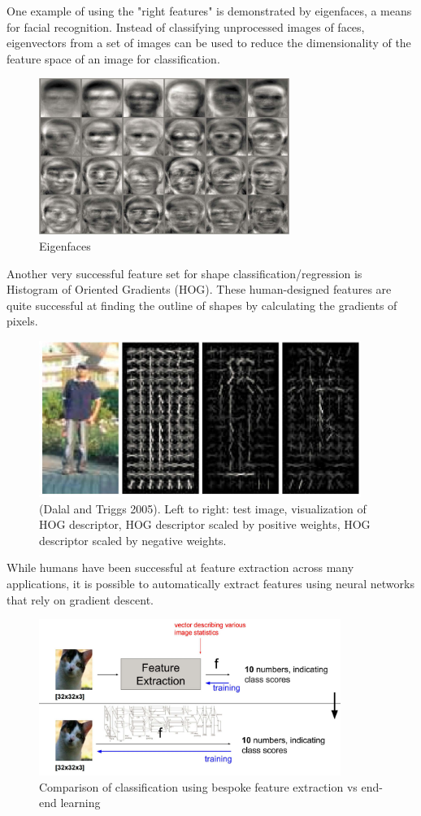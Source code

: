 \documentclass[twoside]{article}
\begin{document}
One example of using the "right features" is demonstrated by eigenfaces, a means for facial recognition. Instead of classifying unprocessed images of faces, eigenvectors from a set of images can be used to reduce the dimensionality of the feature space of an image for classification.
\begin{figure}[H]
\centering
\includegraphics[height = 2in]{pics/lecture_8_eigenfaces.jpg}
\caption{Eigenfaces}
\end{figure}

Another very successful feature set for shape classification/regression is Histogram of Oriented Gradients (HOG). These human-designed features are quite successful at finding the outline of shapes by calculating the gradients of pixels.

\begin{figure}[H]
\centering
\includegraphics[height = 2in]{pics/lecture_8_HOG.jpg}
\caption{(Dalal and Triggs 2005). Left to right: test image, visualization of HOG descriptor, HOG descriptor scaled by positive weights, HOG descriptor scaled by negative weights.}
\end{figure}

While humans have been successful at feature extraction across many applications, it is possible to automatically extract features using neural networks that rely on gradient descent.
\begin{figure}[H]
\centering
\includegraphics[height = 2in]{pics/lecture_8_feature_extraction.jpg}
\caption{Comparison of classification using bespoke feature extraction vs end-end learning}
\end{figure}
\end{document}
